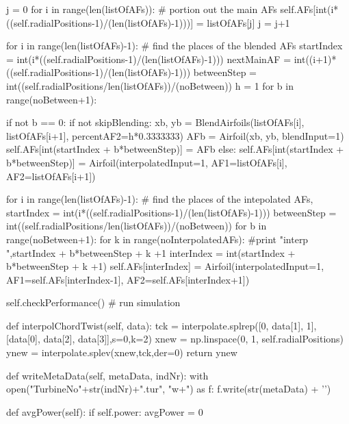 \begin{pythoncode}
        j = 0
        for i in range(len(listOfAFs)): # portion out the main AFs
            self.AFs[int(i*((self.radialPositions-1)/(len(listOfAFs)-1)))] = listOfAFs[j]
            j = j+1


        for i in range(len(listOfAFs)-1): # find the places of the blended AFs
            startIndex = int(i*((self.radialPositions-1)/(len(listOfAFs)-1)))
            nextMainAF = int((i+1)*((self.radialPositions-1)/(len(listOfAFs)-1)))
            betweenStep = int((self.radialPositions/len(listOfAFs))/(noBetween))
            h = 1
            for b in range(noBetween+1):
                
                if not b == 0:
                    if not skipBlending:
                        xb, yb = BlendAirfoils(listOfAFs[i], listOfAFs[i+1], percentAF2=h*0.3333333)
                        AFb = Airfoil(xb, yb, blendInput=1)
                        self.AFs[int(startIndex + b*betweenStep)] = AFb
                    else:
                        self.AFs[int(startIndex + b*betweenStep)] = Airfoil(interpolatedInput=1,
                                                                            AF1=listOfAFs[i], 
                                                                            AF2=listOfAFs[i+1])

        for i in range(len(listOfAFs)-1): # find the places of the intepolated AFs,
            startIndex = int(i*((self.radialPositions-1)/(len(listOfAFs)-1)))
            betweenStep = int((self.radialPositions/len(listOfAFs))/(noBetween))
            for b in range(noBetween+1):
                for k in range(noInterpolatedAFs):
                    #print "interp ",startIndex + b*betweenStep + k +1
                    interIndex = int(startIndex + b*betweenStep + k +1)
                    self.AFs[interIndex] = Airfoil(interpolatedInput=1, AF1=self.AFs[interIndex-1], AF2=self.AFs[interIndex+1])


        self.checkPerformance() # run simulation

    def interpolChordTwist(self, data):
        tck = interpolate.splrep([0, data[1], 1], [data[0], data[2], data[3]],s=0,k=2)
        xnew = np.linspace(0, 1, self.radialPositions)
        ynew = interpolate.splev(xnew,tck,der=0)        
        return ynew
    
    def writeMetaData(self, metaData, indNr):
        with open("TurbineNo"+str(indNr)+".tur", "w+") as f:
            f.write(str(metaData) + '\n') 

    def avgPower(self):
        if self.power:
            avgPower = 0


\end{pythoncode}
